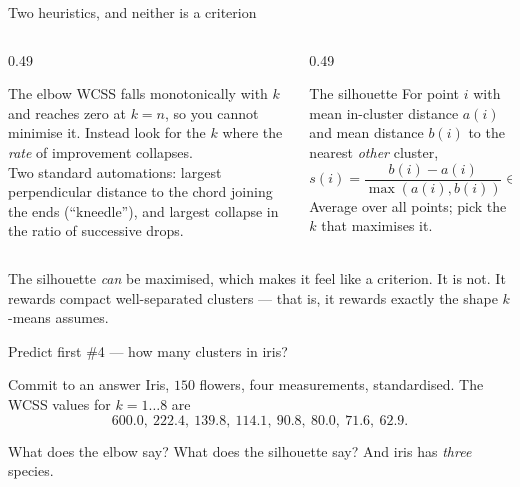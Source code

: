 \documentclass[aspectratio=169]{beamer}
\begin{document}
\begin{frame}[shrink=6]{Two heuristics, and neither is a criterion}
  \begin{columns}[T]
    \begin{column}{0.49\textwidth}
      \begin{block}{The elbow}
        \small WCSS falls monotonically with $k$ and reaches zero at
        $k = n$, so you cannot minimise it. Instead look for the $k$ where
        the \emph{rate} of improvement collapses.
        \\[0.3em]
        Two standard automations: largest perpendicular distance to the chord
        joining the ends (``kneedle''), and largest collapse in the ratio of
        successive drops.
      \end{block}
    \end{column}
    \begin{column}{0.49\textwidth}
      \begin{block}{The silhouette}
        \small For point $i$ with mean in-cluster distance $a(i)$ and mean
        distance $b(i)$ to the nearest \emph{other} cluster,
        \[
          s(i) = \frac{b(i) - a(i)}{\max(a(i), b(i))} \in [-1, 1].
        \]
        Average over all points; pick the $k$ that maximises it.
      \end{block}
    \end{column}
  \end{columns}
  \vspace{0.2em}
  \begin{alertblock}{}
    \centering\small
    The silhouette \emph{can} be maximised, which makes it feel like a
    criterion. It is not. It rewards compact well-separated clusters ---
    that is, it rewards exactly the shape $k$-means assumes.
  \end{alertblock}
\end{frame}

\begin{frame}[shrink=8]{Predict first \#4 --- how many clusters in iris?}
  \begin{alertblock}{Commit to an answer}
    Iris, $150$ flowers, four measurements, standardised. The WCSS values for
    $k = 1 \ldots 8$ are
    \[
      600.0,\ 222.4,\ 139.8,\ 114.1,\ 90.8,\ 80.0,\ 71.6,\ 62.9 .
    \]

    \medskip
    \centering\large
    What does the elbow say? What does the silhouette say? And iris has
    \emph{three} species.
  \end{alertblock}
\end{frame}
\end{document}
